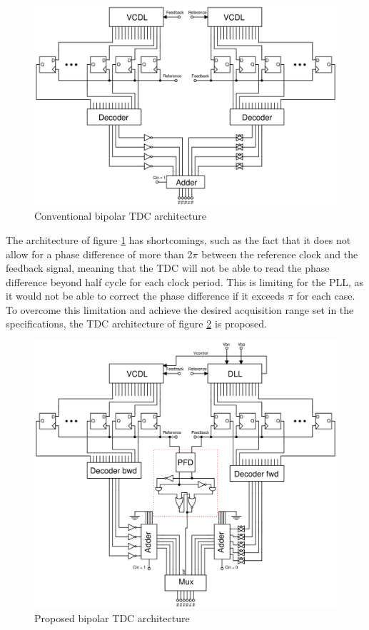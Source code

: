 \begin{figure}[h]
    \centering
    \includegraphics[width=1\textwidth]{figures/TDC_conventional_architecture.png}
    \caption{Conventional bipolar TDC architecture}
    \label{fig:TDC_conventional_architecture}
\end{figure}

The architecture of figure \ref{fig:TDC_conventional_architecture} has shortcomings, such as the fact that it does not allow for a phase difference of more than 2$\pi$ between the
reference clock and the feedback signal, meaning that the TDC will not be able to read the phase difference beyond half cycle for each clock period. This is limiting for the PLL, as it
would not be able to correct the phase difference if it exceeds $\pi$ for each case. To overcome this limitation and achieve the desired acquisition range set in the specifications, 
the TDC architecture of figure \ref{fig:TDC_proposed_architecture} is proposed.

\begin{figure}[h]
    \centering
    \includegraphics[width=1\textwidth]{figures/TDC_proposed_architecture.png}
    \caption{Proposed bipolar TDC architecture}
    \label{fig:TDC_proposed_architecture}
\end{figure}

